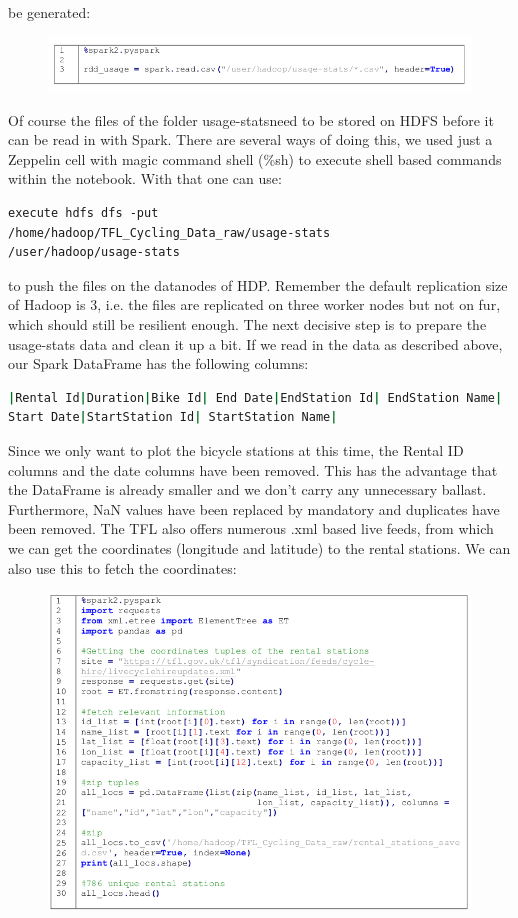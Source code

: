 \documentclass[12pt]{article}
\begin{document}
be generated:
\begin{figure}[H]
\hspace{-0.8cm}
\includegraphics[width=1.1\textwidth]{img/spark1}\label{pic:spark1}
\end{figure}
\noindent Of course the files of the folder \glqq usage-stats\grqq need to be stored on HDFS before it can be read in with Spark. There are several ways of doing this, we used just a Zeppelin cell with magic command shell (\%sh) to execute shell based commands within the notebook. With that one can use:
\begin{lstlisting}[breaklines=true]
execute hdfs dfs -put
/home/hadoop/TFL_Cycling_Data_raw/usage-stats
/user/hadoop/usage-stats
\end{lstlisting}
to push the files on the datanodes of HDP. Remember the default replication size of Hadoop is 3, i.e. the
files are replicated on three worker nodes but not on fur, which should still be resilient enough.
The next decisive step is to prepare the usage-stats data and clean it up a bit. If we read in the data as
described above, our Spark DataFrame has the following columns:
\begin{lstlisting}[language=bash,breaklines=true]
|Rental Id|Duration|Bike Id| End Date|EndStation Id| EndStation Name|
Start Date|StartStation Id| StartStation Name|
\end{lstlisting}
Since we only want to plot the bicycle stations at this time, the Rental ID columns and the date columns
have been removed. This has the advantage that the DataFrame is already smaller and we don't carry any
unnecessary ballast. Furthermore, NaN values have been replaced by mandatory \grqq and duplicates have been removed. The TFL also offers numerous .xml based live feeds, from which we can get the coordinates (longitude and latitude) to the rental stations. We can also use this to fetch the coordinates:
\begin{figure}[H]
\hspace{-0.8cm}
\includegraphics[width=1.1\textwidth]{img/spark2}\label{pic:spark2}
\end{figure}
\end{document}
